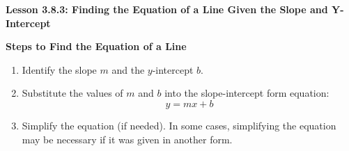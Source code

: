  \begin{center}
\textbf{Lesson 3.8.3: Finding the Equation of a Line Given the Slope and Y-Intercept}
\end{center}

\vspace*{1ex}

\noindent\textbf{Steps to Find the Equation of a Line}

\begin{enumerate}
    \item Identify the slope $m$ and the $y$-intercept $b$.
    \item Substitute the values of $m$ and $b$ into the slope-intercept form equation:
    \[
    y = mx + b
    \]
    \item Simplify the equation (if needed). In some cases, simplifying the equation may be necessary if it was given in another form.
\end{enumerate}



